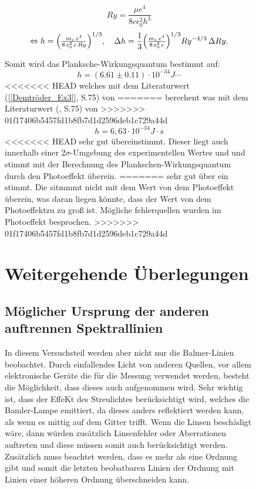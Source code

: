 \begin{figure}
\begin{equation}
    Ry = \frac{\mu e^4}{8 c \epsilon_0^2h^3}
\end{equation}
\begin{equation}
  \Leftrightarrow h
  = \Bigl(\tfrac{m_e\,e^{4}}{8\,\varepsilon_{0}^{2}\,c\,Ry}\Bigr)^{1/3},
  \quad
  \Delta h
  = \frac{1}{3}
    \Bigl(\tfrac{m_e\,e^{4}}{8\,\varepsilon_{0}^{2}\,c}\Bigr)^{1/3}
    Ry^{-4/3}\,\Delta Ry.
\end{equation}

Somit wird das Planksche-Wirkungsquantum bestimmt auf:
\begin{equation}
    h = (6.61 \pm 0.11)\cdot 10^{-34} J\cdots
\end{equation}
<<<<<<< HEAD
welches mit dem Literaturwert (\cref{[Demtröder_Ex3]}, S.75) von
=======
berechent was mit dem Literaturwert (\cite{Demtröder_Ex3}, S.75) von
>>>>>>> 01f17406b5457fd1b8fb7d1d2596deb1c729a44d
\begin{equation}
    h = 6,63 \cdot10^{-34} J\cdot s
\end{equation}
<<<<<<< HEAD
sehr gut übereinstimmt.
Dieser liegt auch innerhalb einer $2\sigma$-Umgebung des experimentellen Wertes und und stimmt mit der Berechnung des Plankschen-Wirkungsquantum durch den Photoeffekt überein.
=======
sehr gut über ein stimmt.
Die sitmmmt nicht mit dem Wert von dem Photoeffekt überein, was daran liegen könnte, dass der Wert von dem Photoeffektzu zu groß ist.
Mögliche fehlerquellen wurden im Photoeffekt besprochen.
>>>>>>> 01f17406b5457fd1b8fb7d1d2596deb1c729a44d


\section{Weitergehende Überlegungen}
\subsection{Möglicher Ursprung der anderen auftrennen Spektrallinien}
In diesem Versuchsteil werden aber nicht nur die Balmer-Linien beobachtet. 
Durch einfallendes Licht von anderen Quellen, vor allem elektronische Geräte die für die Messung verwendet werden, besteht die Möglichkeit, dass dieses auch aufgenommen wird.
Sehr wichtig ist, dass der EffeKt des Streulichtes berücksichtigt wird, welches die Bamler-Lampe emittiert, da dieses anders reflektiert werden kann, als wenn es mittig auf dem Gitter trifft.
Wenn die Linsen beschädigt wäre, dann würden zusätzlich Linsenfehler oder Aberrationen auftreten und diese müssen somit auch berücksichtigt werden. 
Zusätzlich muss beachtet werden, dass es mehr als eine Ordnung gibt und somit die letzten beobatbaren Linien der Ordnung mit Linien einer höheren Ordnung überschneiden kann.


\end{figure}

